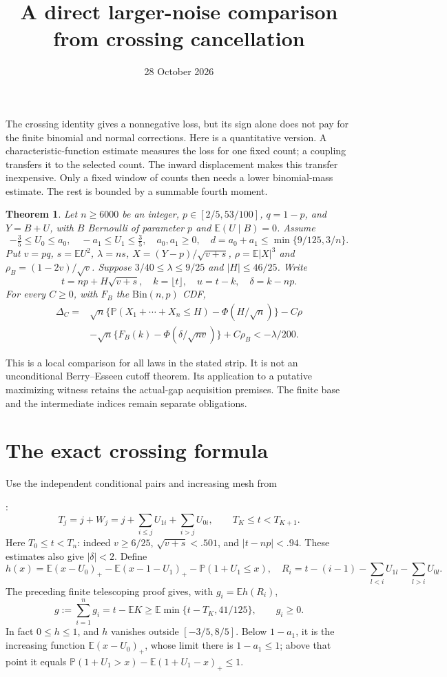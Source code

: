 \documentclass[11pt]{article}
\title{A direct larger-noise comparison from crossing cancellation}
\author{}\date{28 October 2026}
\newtheorem{theorem}{Theorem}\newtheorem{lemma}[theorem]{Lemma}
\newcommand{\E}{\mathbb E}\newcommand{\Pp}{\mathbb P}
\begin{document}
\maketitle

The crossing identity gives a nonnegative loss, but its sign alone does not
pay for the finite binomial and normal corrections. Here is a quantitative
version. A characteristic-function estimate measures the loss for one fixed
count; a coupling transfers it to the selected count. The inward displacement
makes this transfer inexpensive. Only a fixed window of counts then needs a
lower binomial-mass estimate. The rest is bounded by a summable fourth moment.

\begin{theorem}\label{thm:main}
Let $n\ge6000$ be an integer, $p\in[2/5,53/100]$, $q=1-p$, and
$Y=B+U$, with $B$ Bernoulli of parameter $p$ and $\E(U\mid B)=0$.
Assume
\[
 -\tfrac35\le U_0\le a_0,\quad -a_1\le U_1\le\tfrac35,
 \quad a_0,a_1\ge0,\quad d=a_0+a_1\le\min\{9/125,3/n\}.
\]
Put $v=pq$, $s=\E U^2$, $\lambda=ns$, $X=(Y-p)/\sqrt{v+s}$,
$\rho=\E|X|^3$ and $\rho_B=(1-2v)/\sqrt v$. Suppose
$3/40\le\lambda\le9/25$ and $|H|\le46/25$. Write
\[
 t=np+H\sqrt{v+s},\quad k=\lfloor t\rfloor,\quad u=t-k,
 \quad\delta=k-np.
\]
For every $C\ge0$, with $F_B$ the $\mathrm{Bin}(n,p)$ CDF,
\begin{align*}
 \Delta_C={}&\sqrt n\{\Pp(X_1+\cdots+X_n\le H)-\Phi(H/\sqrt n)\}-C\rho\\
 &-\sqrt n\{F_B(k)-\Phi(\delta/\sqrt{nv})\}+C\rho_B
                         <-\lambda/200.
\end{align*}
\end{theorem}

This is a local comparison for all laws in the stated strip. It is not an
unconditional Berry--Esseen cutoff theorem. Its application to a putative
maximizing witness retains the actual-gap acquisition premises. The finite
base and the intermediate indices remain separate obligations.

\section{The exact crossing formula}
Use the independent conditional pairs and increasing mesh from\par\noindent
{}:
\[
 T_j=j+W_j=j+\sum_{i\le j}U_{1i}+\sum_{i>j}U_{0i},
 \qquad T_K\le t<T_{K+1}.
\]
Here $T_0\le t<T_n$: indeed $v\ge6/25$, $\sqrt{v+s}<.501$, and
$|t-np|<.94$. These estimates also give $|\delta|<2$.
Define
\[
 h(x)=\E(x-U_0)_+-\E(x-1-U_1)_+-\Pp(1+U_1\le x),
 \quad R_i=t-(i-1)-\sum_{l<i}U_{1l}-\sum_{l>i}U_{0l}.
\]
The preceding finite telescoping proof gives, with $g_i=\E h(R_i)$,
\begin{equation}\label{eq:age}
 g:=\sum_{i=1}^n g_i=t-\E K
       \ge\E\min\{t-T_K,41/125\},\qquad g_i\ge0.
\end{equation}
In fact $0\le h\le1$, and $h$ vanishes outside $[-3/5,8/5]$.
Below $1-a_1$, it is the increasing function $\E(x-U_0)_+$, whose
limit there is $1-a_1\le1$; above that point it equals
$\Pp(1+U_1>x)-\E(1+U_1-x)_+\le1$.
\end{document}
